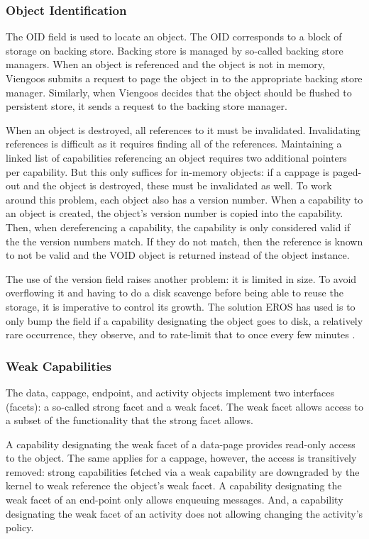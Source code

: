 \subsubsection{Object Identification}

The OID field is used to locate an object.  The OID corresponds to a
block of storage on backing store.  Backing store is managed by
so-called backing store managers.  When an object is referenced and
the object is not in memory, Viengoos submits a request to page the
object in to the appropriate backing store manager.  Similarly, when
Viengoos decides that the object should be flushed to persistent
store, it sends a request to the backing store manager.

When an object is destroyed, all references to it must be invalidated.
Invalidating references is difficult as it requires finding all of the
references.  Maintaining a linked list of capabilities referencing an
object requires two additional pointers per capability.  But this only
suffices for in-memory objects: if a cappage is paged-out and the
object is destroyed, these must be invalidated as well.  To work
around this problem, each object also has a version number.  When a
capability to an object is created, the object's version number is
copied into the capability.  Then, when dereferencing a capability,
the capability is only considered valid if the the version numbers
match.  If they do not match, then the reference is known to not be
valid and the VOID object is returned instead of the object instance.

The use of the version field raises another problem: it is limited in
size.  To avoid overflowing it and having to do a disk scavenge before
being able to reuse the storage, it is imperative to control its
growth.  The solution EROS has used is to only bump the field if a
capability designating the object goes to disk, a relatively rare
occurrence, they observe, and to rate-limit that to once every few
minutes \cite{citation-needed}.

\subsubsection{Weak Capabilities}

The data, cappage, endpoint, and activity objects implement two
interfaces (facets): a so-called strong facet and a weak facet.  The
weak facet allows access to a subset of the functionality that the
strong facet allows.

A capability designating the weak facet of a data-page provides
read-only access to the object.  The same applies for a cappage,
however, the access is transitively removed: strong capabilities
fetched via a weak capability are downgraded by the kernel to weak
reference the object's weak facet.  A capability designating the weak
facet of an end-point only allows enqueuing messages.  And, a
capability designating the weak facet of an activity does not allowing
changing the activity's policy.

